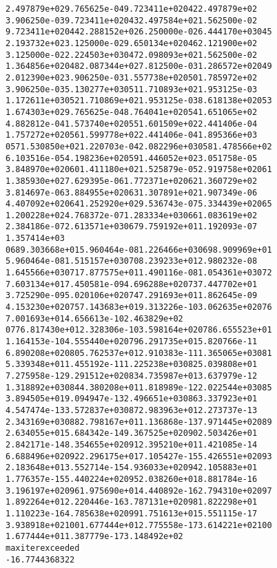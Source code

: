 \documentclass[letterpaper,10pt,english]{/usr/share/sphinx/texinputs/sphinxhowto}
\newenvironment{InvisibleVerbatim}
        {\begin{mdframed}[leftmargin=0.1\linewidth,innerleftmargin=3pt,innerrightmargin=3pt, userdefinedwidth=1\linewidth, linewidth=0pt, linecolor=white, usetwoside=false]}
        {\end{mdframed}}
\begin{document}
\begin{InvisibleVerbatim}
\begin{alltt}
2.497879e+02   9.765625e-04   9.723411e+02  042   2.497879e+02
3.906250e-03   9.723411e+02  043   2.497584e+02   1.562500e-02
9.723411e+02  044   2.288152e+02   6.250000e-02   6.444170e+03  045
2.193732e+02   3.125000e-02   9.650134e+02  046   2.121900e+02
3.125000e-02   2.224503e+03  047   2.098093e+02   1.562500e-02
1.364856e+02  048   2.087344e+02   7.812500e-03   1.286572e+02  049
2.012390e+02   3.906250e-03   1.557738e+02  050   1.785972e+02
3.906250e-03   5.130277e+03  051   1.710893e+02   1.953125e-03
1.172611e+03  052   1.710869e+02   1.953125e-03   8.618138e+02  053
1.674303e+02   9.765625e-04   8.764041e+02  054   1.651065e+02
4.882812e-04   1.573740e+02  055   1.601509e+02   2.441406e-04
1.757272e+02  056   1.599778e+02   2.441406e-04   1.895366e+03
 057   1.530850e+02   1.220703e-04   2.082296e+03  058   1.478566e+02
6.103516e-05   4.198236e+02  059   1.446052e+02   3.051758e-05
3.848970e+02  060   1.411180e+02   1.525879e-05   2.919758e+02  061
1.385930e+02   7.629395e-06   1.772371e+02  062   1.360729e+02
3.814697e-06   3.884955e+02  063   1.307891e+02   1.907349e-06
4.407092e+02  064   1.252920e+02   9.536743e-07   5.334439e+02  065
1.200228e+02   4.768372e-07   1.283334e+03  066   1.083619e+02
2.384186e-07   2.613571e+03  067   9.759192e+01   1.192093e-07
1.357414e+03
 068   9.303668e+01   5.960464e-08   1.226466e+03  069   8.909969e+01
5.960464e-08   1.515157e+03  070   8.239233e+01   2.980232e-08
1.645566e+03  071   7.877575e+01   1.490116e-08   1.054361e+03  072
7.603134e+01   7.450581e-09   4.696288e+02  073   7.447702e+01
3.725290e-09   5.020106e+02  074   7.291693e+01   1.862645e-09
4.153230e+02  075   7.143683e+01   9.313226e-10   3.062635e+02  076
7.001693e+01   4.656613e-10   2.463829e+02
 077   6.817430e+01   2.328306e-10   3.598164e+02  078   6.655523e+01
1.164153e-10   4.555440e+02  079   6.291735e+01   5.820766e-11
6.890208e+02  080   5.762537e+01   2.910383e-11   1.365065e+03  081
5.339348e+01   1.455192e-11   1.225238e+03  082   5.039808e+01
7.275958e-12   9.291512e+02  083   4.735987e+01   3.637979e-12
1.318892e+03  084   4.380208e+01   1.818989e-12   2.022544e+03  085
3.894505e+01   9.094947e-13   2.496651e+03  086   3.337923e+01
4.547474e-13   3.572837e+03  087   2.983963e+01   2.273737e-13
2.343169e+03  088   2.798167e+01   1.136868e-13   7.971445e+02  089
2.634055e+01   5.684342e-14   9.367525e+02  090   2.503426e+01
2.842171e-14   8.354655e+02  091   2.395210e+01   1.421085e-14
6.688496e+02  092   2.296175e+01   7.105427e-15   5.426551e+02  093
2.183648e+01   3.552714e-15   4.936033e+02  094   2.105883e+01
1.776357e-15   5.440224e+02  095   2.038260e+01   8.881784e-16
3.196197e+02  096   1.975690e+01   4.440892e-16   2.794310e+02  097
1.892264e+01   2.220446e-16   3.787131e+02  098   1.822298e+01
1.110223e-16   4.785638e+02  099   1.751613e+01   5.551115e-17
3.938918e+02  100   1.677444e+01   2.775558e-17   3.614221e+02  100
1.677444e+01   1.387779e-17   3.148492e+02
maxiter exceeded
-16.7744368322
\end{alltt}

            \end{InvisibleVerbatim}
            
\end{document}
